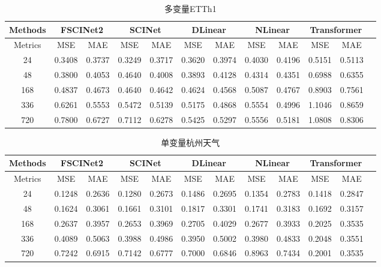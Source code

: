 \documentclass[twoside,a4paper]{article}
\begin{document}
\begin{CJK*}{UTF8}{gkai}
\begin{table}[H]
  \centering
  \caption{多变量ETTh1}
  \begin{tabular}{c c c c c c c c c c c c}
    \hline
    \textbf{Methods} & \multicolumn{2}{c}{FSCINet2}& \multicolumn{2}{c}{SCINet} & \multicolumn{2}{c}{DLinear}
    &\multicolumn{2}{c}{NLinear} &\multicolumn{2}{c}{Transformer}\\
    \hline
    Metrics & MSE & MAE & MSE & MAE & MSE & MAE &MSE & MAE & MSE & MAE \\
    \hline\hline
     24  & 0.3408 & 0.3737 & 0.3249 & 0.3717 & 0.3620 & 0.3974 & 0.4030 & 0.4196 & 0.5151 & 0.5113 \\
     48  & 0.3800 & 0.4053 & 0.4640 & 0.4008 & 0.3893 & 0.4128 & 0.4314 & 0.4351 & 0.6988 & 0.6355 \\
     168 & 0.4837 & 0.4673 & 0.4640 & 0.4642 & 0.4624 & 0.4568 & 0.5087 & 0.4767 & 0.8903 & 0.7561 \\
     336 & 0.6261 & 0.5553 & 0.5472 & 0.5139 & 0.5175 & 0.4868 & 0.5554 & 0.4996 & 1.1046 & 0.8659 \\
     720 & 0.7800 & 0.6727 & 0.7112 & 0.6278 & 0.5425 & 0.5297 & 0.5556 & 0.5181 & 1.0808 & 0.8306 \\
    \hline\hline
  \end{tabular}
  \label{tab:pro_pro}
\end{table}

\begin{table}[H]
  \centering
  \caption{单变量杭州天气}
  \begin{tabular}{c c c c c c c c c c c c}
    \hline
    \textbf{Methods} & \multicolumn{2}{c}{FSCINet2}& \multicolumn{2}{c}{SCINet} & \multicolumn{2}{c}{DLinear}
    &\multicolumn{2}{c}{NLinear} &\multicolumn{2}{c}{Transformer}\\
    \hline
    Metrics & MSE & MAE & MSE & MAE & MSE & MAE &MSE & MAE & MSE & MAE \\
    \hline\hline
     24  & 0.1248 & 0.2636 & 0.1280 & 0.2673 & 0.1486 & 0.2695 & 0.1354 & 0.2783 & 0.1418 & 0.2847 \\
     48  & 0.1624 & 0.3061 & 0.1661 & 0.3101 & 0.1817 & 0.3301 & 0.1741 & 0.3183 & 0.1692 & 0.3157 \\
     168 & 0.2637 & 0.3957 & 0.2653 & 0.3969 & 0.2705 & 0.4029 & 0.2677 & 0.3933 & 0.2025 & 0.3535 \\
     336 & 0.4089 & 0.5063 & 0.3988 & 0.4986 & 0.3950 & 0.5002 & 0.3980 & 0.4833 & 0.2048 & 0.3551 \\
     720 & 0.7242 & 0.6915 & 0.7142 & 0.6777 & 0.7000 & 0.6846 & 0.8963 & 0.7434 & 0.2001 & 0.3535 \\
    \hline\hline
  \end{tabular}
  \label{tab:pro_pro}
\end{table}


\end{CJK*}
\end{document}
